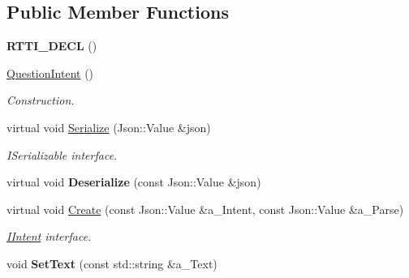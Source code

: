 \subsection*{Public Member Functions}
\begin{DoxyCompactItemize}
\item 
\mbox{\label{class_question_intent_afd01d7e52c68fb88fb3d2b2ec83a7e6e}} 
{\bfseries R\+T\+T\+I\+\_\+\+D\+E\+CL} ()
\item 
\mbox{\label{class_question_intent_a500e3eafcbace81edbe9bea2b082d174}} 
\hyperlink{class_question_intent_a500e3eafcbace81edbe9bea2b082d174}{Question\+Intent} ()
\begin{DoxyCompactList}\small\item\em Construction. \end{DoxyCompactList}\item 
\mbox{\label{class_question_intent_a671b053bf3e1ab85296a923f7da80803}} 
virtual void \hyperlink{class_question_intent_a671b053bf3e1ab85296a923f7da80803}{Serialize} (Json\+::\+Value \&json)
\begin{DoxyCompactList}\small\item\em I\+Serializable interface. \end{DoxyCompactList}\item 
\mbox{\label{class_question_intent_a244bb8cb308664439aa29a025137bce6}} 
virtual void {\bfseries Deserialize} (const Json\+::\+Value \&json)
\item 
\mbox{\label{class_question_intent_ae90fb07634ef1c858268ef6d05c5df54}} 
virtual void \hyperlink{class_question_intent_ae90fb07634ef1c858268ef6d05c5df54}{Create} (const Json\+::\+Value \&a\+\_\+\+Intent, const Json\+::\+Value \&a\+\_\+\+Parse)
\begin{DoxyCompactList}\small\item\em \hyperlink{class_i_intent}{I\+Intent} interface. \end{DoxyCompactList}\item 
\mbox{\label{class_question_intent_a0f53f14b400b065bb08e518b3ce689d3}} 
void {\bfseries Set\+Text} (const std\+::string \&a\+\_\+\+Text)
\item 

\end{DoxyCompactItemize}
